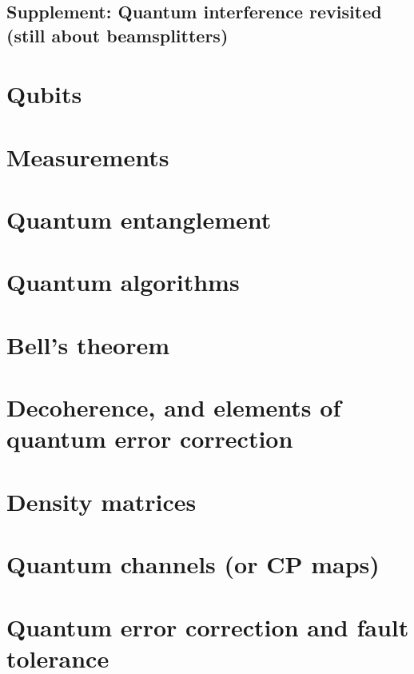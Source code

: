 \documentclass[
]{book}
\theoremstyle{definition}
\theoremstyle{definition}
\theoremstyle{definition}
\theoremstyle{remark}
\begin{document}
\hypertarget{supplement-quantum-interference-revisited-still-about-beamsplitters}{%
\section{Supplement: Quantum interference revisited (still about beamsplitters)}\label{supplement-quantum-interference-revisited-still-about-beamsplitters}}

\hypertarget{qubits}{%
\chapter{Qubits}\label{qubits}}

\hypertarget{measurements}{%
\chapter{Measurements}\label{measurements}}

\hypertarget{quantum-entanglement}{%
\chapter{Quantum entanglement}\label{quantum-entanglement}}

\hypertarget{quantum-algorithms}{%
\chapter{Quantum algorithms}\label{quantum-algorithms}}

\hypertarget{bells-theorem}{%
\chapter{Bell's theorem}\label{bells-theorem}}

\hypertarget{decoherence-and-elements-of-quantum-error-correction}{%
\chapter{Decoherence, and elements of quantum error correction}\label{decoherence-and-elements-of-quantum-error-correction}}

\hypertarget{density-matrices}{%
\chapter{Density matrices}\label{density-matrices}}

\hypertarget{quantum-channels-or-cp-maps}{%
\chapter{Quantum channels (or CP maps)}\label{quantum-channels-or-cp-maps}}

\hypertarget{quantum-error-correction-and-fault-tolerance}{%
\chapter{Quantum error correction and fault tolerance}\label{quantum-error-correction-and-fault-tolerance}}

  
\end{document}
